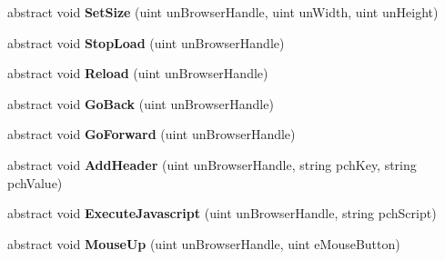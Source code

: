 \begin{DoxyCompactItemize}
abstract void {\bfseries Set\+Size} (uint un\+Browser\+Handle, uint un\+Width, uint un\+Height)
\item 
\mbox{\label{class_valve_1_1_steamworks_1_1_i_steam_h_t_m_l_surface_a98172461db4b5a0c745103a198f5e424}} 
abstract void {\bfseries Stop\+Load} (uint un\+Browser\+Handle)
\item 
\mbox{\label{class_valve_1_1_steamworks_1_1_i_steam_h_t_m_l_surface_a5197eb0870dfd8046ec46519097bbf9f}} 
abstract void {\bfseries Reload} (uint un\+Browser\+Handle)
\item 
\mbox{\label{class_valve_1_1_steamworks_1_1_i_steam_h_t_m_l_surface_aa2da244bec4ad3a6fd0f12a6ba128a52}} 
abstract void {\bfseries Go\+Back} (uint un\+Browser\+Handle)
\item 
\mbox{\label{class_valve_1_1_steamworks_1_1_i_steam_h_t_m_l_surface_a1cf9bd71fea89ab249b4113b074046bd}} 
abstract void {\bfseries Go\+Forward} (uint un\+Browser\+Handle)
\item 
\mbox{\label{class_valve_1_1_steamworks_1_1_i_steam_h_t_m_l_surface_ad2edca016c6d83dae56db9d472739ea6}} 
abstract void {\bfseries Add\+Header} (uint un\+Browser\+Handle, string pch\+Key, string pch\+Value)
\item 
\mbox{\label{class_valve_1_1_steamworks_1_1_i_steam_h_t_m_l_surface_a0457895e9f028d6ff5d698bd16e0813d}} 
abstract void {\bfseries Execute\+Javascript} (uint un\+Browser\+Handle, string pch\+Script)
\item 
\mbox{\label{class_valve_1_1_steamworks_1_1_i_steam_h_t_m_l_surface_a5fca8c4508e0ab876b4b2dfaedd724a9}} 
abstract void {\bfseries Mouse\+Up} (uint un\+Browser\+Handle, uint e\+Mouse\+Button)
\item 
\mbox{\label{class_valve_1_1_steamworks_1_1_i_steam_h_t_m_l_surface_a13063ef14de98d57a89fbc3cfb9936b1}} 

\end{DoxyCompactItemize}
